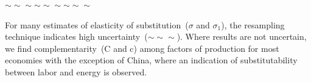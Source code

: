\documentclass[preprint,authoryear,12pt]{elsarticle}\usepackage[]{graphicx}\usepackage[]{color}
\begin{document}
          {}
          {}
          {}

          {}
          {}
          {}
          
          {}
          {}
          {}

          {}
          {}
          {}

          {}
          {}
          {}

          {}
          {}
          {}

          {\firstrow{$\sim\sim\sim$}{$\sim\sim\sim$}{$\sim\sim\sim$}{$\sim\sim\sim$}}
          {}
          {\thirdrow{$\sim\sim\sim$}{$\sim\sim\sim$}{$\sim\sim\sim$}}

          {}
          {}
          {}

          {\firstrow{$\sim\sim\sim$}{$\sim\sim\sim$}{$\sim\sim\sim$}{$\sim\sim\sim$}}
          {\secondrow{$\sim\sim\sim$}{$\sim\sim\sim$}{$\sim\sim\sim$}
                     {$\sim\sim\sim$}{$\sim\sim\sim$}{$\sim\sim\sim$}}
          {\thirdrow{$\sim\sim\sim$}{$\sim\sim\sim$}{$\sim\sim\sim$}}

For many estimates of elasticity of substitution~($\sigma$ and $\sigma_1$), 
the resampling technique indicates high uncertainty~($\sim\sim\sim$). 
Where results are not uncertain, 
we find complementarity~(C and c) among factors of production 
for most economies with the exception of China, 
where an indication of substitutability between labor and energy is observed.
\end{document}
